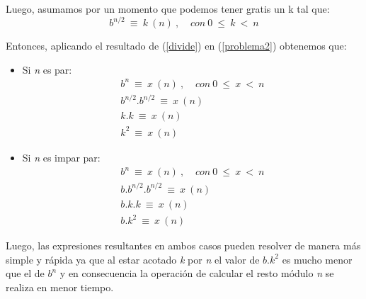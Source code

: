 {Luego, asumamos por un momento que podemos tener gratis un k tal que:
	\begin{equation}
		b^{n/2}\ \equiv\ k\ (n)\ , \hspace{10pt}\ con\ 0\ \leq\ k\ <\ n 
	\label{divide}
	\end{equation}

Entonces, aplicando el resultado de (\ref{divide}) en (\ref{problema2}) obtenemos que:
	\begin{itemize}
		\item{
		Si \textit{n} es par:
			\begin{eqnarray}
				b^n\ \equiv\ x\ (n)\ , \hspace{10pt}\ con\ 0\ \leq\ x\ <\ n \nonumber\\
				b^{n/2}.b^{n/2}\ \equiv\ x\ (n) \nonumber\\
				k.k\ \equiv\ x\ (n) \nonumber\\
				k^2\ \equiv\ x\ (n)
			\label{recursion_par}
			\end{eqnarray}
		}
		
		\item{
		Si \textit{n} es impar par:
			\begin{eqnarray}
				b^n\ \equiv\ x\ (n)\ , \hspace{10pt}\ con\ 0\ \leq\ x\ <\ n \nonumber\\
				b.b^{n/2}.b^{n/2}\ \equiv\ x\ (n) \nonumber\\
				b.k.k\ \equiv\ x\ (n) \nonumber\\
				b.k^2\ \equiv\ x\ (n)
			\label{recursion_impar} 
			\end{eqnarray}
		}
	\end{itemize}
Luego, las expresiones resultantes en ambos casos pueden resolver de manera más simple y rápida ya que al estar acotado \textit{k} por \textit{n} el valor de $b.k^2$ es mucho menor que el de  $b^n$ y en consecuencia la operación de calcular el resto módulo \textit{n} se realiza en menor tiempo.

}

